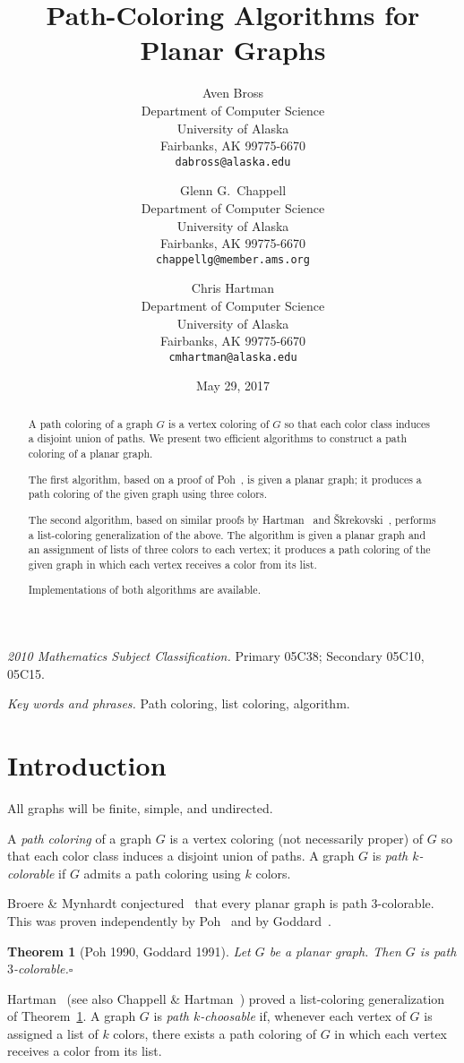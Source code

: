 \documentclass[12pt,letterpaper]{article}
\date{May 29, 2017}
\title{Path-Coloring Algorithms for Planar Graphs}
\author{Aven Bross\\
\small Department of Computer Science\\
\small University of Alaska\\
\small Fairbanks, AK 99775-6670\\
\small\texttt{dabross{@}alaska.edu} \and
Glenn G.~Chappell\\
\small Department of Computer Science\\
\small University of Alaska\\
\small Fairbanks, AK 99775-6670\\
\small\texttt{chappellg{@}member.ams.org} \and
Chris Hartman\\
\small Department of Computer Science\\
\small University of Alaska\\
\small Fairbanks, AK 99775-6670\\
\small\texttt{cmhartman{@}alaska.edu}}
\theoremstyle{plain}
\newtheorem{theorem}[lemma]{Theorem}         %
\theoremstyle{definition}
\newcommand{\ggcqedsymbol}{$\square$}
\newcommand{\ggcqed}{\hbox{}\nobreak\hbox{\quad\ggcqedsymbol}}
\newcommand{\ggcnopf}{\ggcqed}
\newcommand{\defterm}[1]{\emph{#1}} %
\newcommand{\abstdefterm}[1]{#1} %
\begin{document}
\maketitle
\centerline{\small \textit{2010 Mathematics Subject Classification.}
 Primary 05C38; Secondary 05C10, 05C15.}
\centerline{\small \textit{Key words and phrases.}
 Path coloring, list coloring, algorithm.}

\begin{abstract}
A \abstdefterm{path coloring} of a graph $G$ is a vertex coloring
of $G$ so that each color class induces a disjoint union of paths.
We present two efficient algorithms
to construct a path coloring of a planar graph.

The first algorithm, based on a proof of Poh~\cite{Poh1990},
is given a planar graph;
it produces a path coloring of the given graph
using three colors.

The second algorithm,
based on similar proofs
by Hartman~\cite{Har1997}
and \v{S}krekovski~\cite{Skr1999},
performs a list-coloring generalization of the above.
The algorithm is given a planar graph and an assignment of lists of
three colors to each vertex;
it produces a path coloring of the given graph
in which each vertex receives a color from its list.

Implementations of both algorithms are available.
\end{abstract}


\section{Introduction}

All graphs will be finite, simple, and undirected.

A \defterm{path coloring} of a graph $G$ is a vertex coloring
(not necessarily proper) of $G$ so that each color class induces
a disjoint union of paths.
A graph $G$ is \defterm{path $k$-colorable} if $G$
admits a path coloring using $k$ colors.

Broere \& Mynhardt conjectured~\cite[Conj.~16]{BrMy1985}
that every planar graph is path $3$-colorable.
This was proven independently by Poh~\cite[Thm.~2]{Poh1990}
and by Goddard~\cite[Thm.~1]{God1991}.

\begin{theorem}[Poh 1990, Goddard 1991] \label{T:planar3c}
Let $G$ be a planar graph.
Then $G$ is path $3$-colorable.\ggcnopf\end{theorem}

Hartman~\cite[Thm.~4.1]{Har1997}
(see also Chappell \& Hartman~\cite[Thm.~2.1]{ChHa2017prep})
proved a list-coloring generalization of Theorem~\ref{T:planar3c}.
A graph $G$ is \defterm{path $k$-choosable} if,
whenever each vertex of $G$ is assigned a list of $k$ colors,
there exists a path coloring of $G$ in which each vertex receives
a color from its list.
\end{document}
